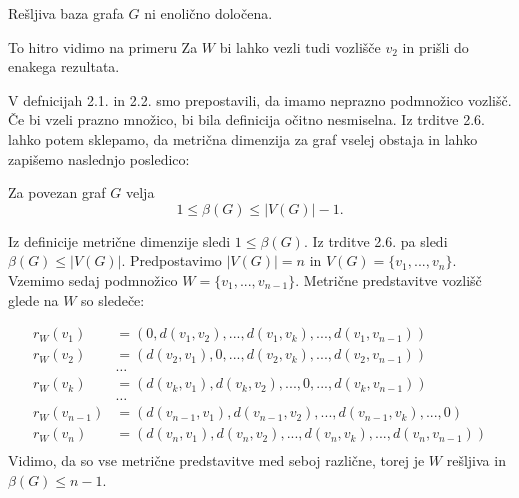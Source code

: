 \documentclass[mat1, tisk]{fmfdelo}
\begin{document}

\begin{trditev}
    Rešljiva baza grafa $G$ ni enolično določena.
\end{trditev}
\begin{dokaz}
    To hitro vidimo na primeru %
    Za $W$ bi lahko vezli tudi vozlišče $v_2$ in prišli do enakega rezultata.
\end{dokaz}

V defnicijah 2.1. in 2.2. smo prepostavili, da imamo neprazno podmnožico vozlišč. Če bi vzeli prazno množico,
bi bila definicija očitno nesmiselna. Iz trditve 2.6. lahko potem sklepamo, da metrična dimenzija za graf vselej 
obstaja in lahko zapišemo naslednjo posledico:

\begin{posledica}
    Za povezan graf $G$ velja 
    $$1 \leq \beta(G) \leq |V(G)| - 1. $$
\end{posledica}
\begin{dokaz}
    Iz definicije metrične dimenzije sledi $1 \leq \beta(G)$. Iz trditve 2.6. pa sledi $\beta(G) \leq |V(G)|.$
    Predpostavimo $|V(G)| = n$ in $V(G) = \{ v_1, ... , v_n\}$. Vzemimo sedaj podmnožico $W = \{ v_1, ... , v_{n-1}\}.$
    Metrične predstavitve vozlišč glede na $W$ so sledeče:

    \begin{align*}
        r_W(v_1) & = (0, d(v_1, v_2), ..., d(v_1, v_k), ... , d(v_1, v_{n-1})) \\
        r_W(v_2) & = (d(v_2, v_1), 0, ..., d(v_2, v_k), ... , d(v_2, v_{n-1})) \\
        & \dots \\
        r_W(v_k) & = (d(v_k, v_1), d(v_k, v_2), ..., 0 , ... , d(v_k, v_{n-1})) \\
        & \dots \\
        r_W(v_{n-1}) & = (d(v_{n-1}, v_1), d(v_{n-1}, v_2), ... , d(v_{n-1}, v_k) , ..., 0) \\
        r_W(v_n) & = (d(v_n, v_1), d(v_n, v_2), ...,  d(v_n, v_k), ... , d(v_n, v_{n-1})) \\
    \end{align*}
    Vidimo, da so vse metrične predstavitve med seboj različne, torej je $W$ rešljiva in $\beta(G) \leq n - 1.$ 
\end{dokaz}
\end{document}
